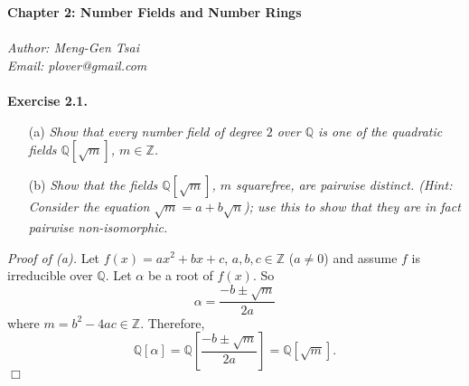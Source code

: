 \documentclass{article}
\begin{document}
\textbf{\Large Chapter 2: Number Fields and Number Rings} \\\\



\emph{Author: Meng-Gen Tsai} \\
\emph{Email: plover@gmail.com} \\\\






\textbf{Exercise 2.1.}
\begin{enumerate}
\item[(a)]
\emph{Show that every number field of degree $2$ over $\mathbb{Q}$
is one of the quadratic fields $\mathbb{Q}[\sqrt{m}]$, $m \in \mathbb{Z}$.}
\item[(b)]
\emph{Show that the fields $\mathbb{Q}[\sqrt{m}]$, $m$ squarefree,
are pairwise distinct.
(Hint: Consider the equation $\sqrt{m} = a+b\sqrt{n}$);
use this to show that they are in fact pairwise non-isomorphic.} \\
\end{enumerate}

\emph{Proof of (a).}
Let $f(x) = ax^2+bx+c$, $a, b, c \in \mathbb{Z}$ ($a \neq 0$)
and assume $f$ is irreducible over $\mathbb{Q}$.
Let $\alpha$ be a root of $f(x)$.
So
$$\alpha = \frac{-b \pm \sqrt{m}}{2a}$$
where $m = b^2-4ac \in \mathbb{Z}$.
Therefore,
$$\mathbb{Q}[\alpha]
= \mathbb{Q}\left[ \frac{-b \pm \sqrt{m}}{2a} \right]
= \mathbb{Q}[\sqrt{m}].$$
$\Box$ \\
\end{document}
